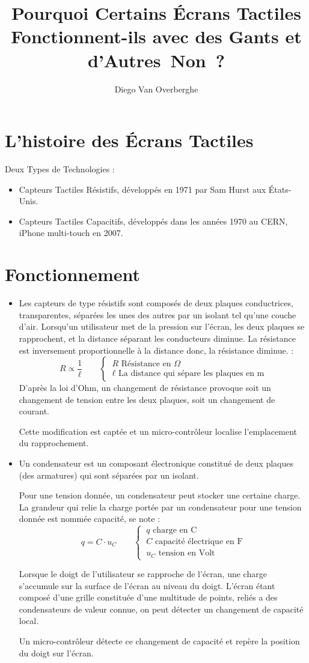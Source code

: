 \documentclass[DIV=12]{scrartcl}
\title{Pourquoi Certains Écrans Tactiles Fonctionnent-ils avec des Gants et d'Autres~Non~?}
\author{Diego Van Overberghe}
\begin{document}
    \maketitle
   \section{L'histoire des Écrans Tactiles}
   Deux Types de Technologies :
   \begin{itemize}
       \item Capteurs Tactiles Résistifs, développés en 1971  par Sam Hurst aux États-Unis.
       \item Capteurs Tactiles Capacitifs, développés dans les années 1970 au CERN, iPhone multi-touch en 2007.
   \end{itemize}
   \section{Fonctionnement}
   \begin{itemize}
        \item Les capteurs de type résistifs sont composés de deux plaques conductrices, transparentes, séparées les unes des autres par un isolant tel qu'une couche d'air.
        Lorsqu'un utilisateur met de la pression sur l'écran, les deux plaques se rapprochent, et la distance séparant les conducteurs diminue. La résistance est inversement proportionnelle à la distance donc, la résistance diminue. : \[R\propto\frac{1}{\ell}\qquad\begin{cases}~R\text{ Résistance en }\Omega\\~\ell\text{ La distance qui sépare les plaques en m}\end{cases}\]
        D'après la loi d'Ohm, un changement de résistance provoque soit un changement de tension entre les deux plaques, soit un changement de courant.
       
        Cette modification est captée et un micro-contrôleur localise l'emplacement du rapprochement.
        \pagebreak\item Un condensateur est un composant électronique constitué de deux plaques (des armatures) qui sont séparées par un isolant.
        
        Pour une tension donnée, un condensateur peut stocker une certaine charge. La grandeur qui relie la charge portée par un condensateur pour une tension donnée est nommée capacité, se note : \[q=C\cdot u_C\qquad\begin{cases}~q\text{ charge en C}\\~C\text{ capacité électrique en F}\\~u_C\text{ tension en Volt}\end{cases}\]
        
        Lorsque le doigt de l'utilisateur se rapproche de l'écran, une charge s'accumule sur la surface de l'écran au niveau du doigt. L'écran étant composé d'une grille constituée d'une multitude de points, reliés a des condensateurs de valeur connue, on peut détecter un changement de capacité local.
        
        Un micro-contrôleur détecte ce changement de capacité et repère la position du doigt sur l'écran.
   \end{itemize}
\end{document}
